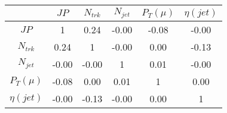 \begin{tabular}{|c|c|c|c|c|c|} 
\hline
 & $JP$ & $N_{trk}$ & $N_{jet}$ & $P_{T} (\mu)$ & $\eta (jet)$ \\ \hline
$JP$ & 1 & 0.24 & -0.00 & -0.08 & -0.00 \\
$N_{trk}$ & 0.24 & 1 & -0.00 & 0.00 & -0.13 \\
$N_{jet}$ & -0.00 & -0.00 & 1 & 0.01 & -0.00 \\
$P_{T} (\mu)$ & -0.08 & 0.00 & 0.01 & 1 & 0.00 \\
$\eta (jet)$ & -0.00 & -0.13 & -0.00 & 0.00 & 1 \\
\hline 
\end{tabular} 


